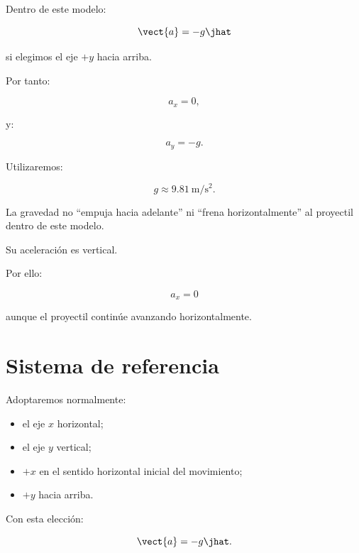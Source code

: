 Dentro de este modelo:

\[
\vect{a}=-g\jhat
\]

si elegimos el eje \(+y\) hacia arriba.

Por tanto:

\[
\boxed{a_x=0},
\]

y:

\[
\boxed{a_y=-g}.
\]

Utilizaremos:

\[
g\approx\SI{9.81}{\meter\per\second\squared}.
\]

\begin{interpretacion}
La gravedad no ``empuja hacia adelante'' ni ``frena horizontalmente'' al
proyectil dentro de este modelo.

Su aceleración es vertical.

Por ello:

\[
a_x=0
\]

aunque el proyectil continúe avanzando horizontalmente.
\end{interpretacion}


\section{Sistema de referencia}

Adoptaremos normalmente:

\begin{itemize}
    \item el eje \(x\) horizontal;
    \item el eje \(y\) vertical;
    \item \(+x\) en el sentido horizontal inicial del movimiento;
    \item \(+y\) hacia arriba.
\end{itemize}

Con esta elección:

\[
\vect{a}
=
-g\jhat.
\]

